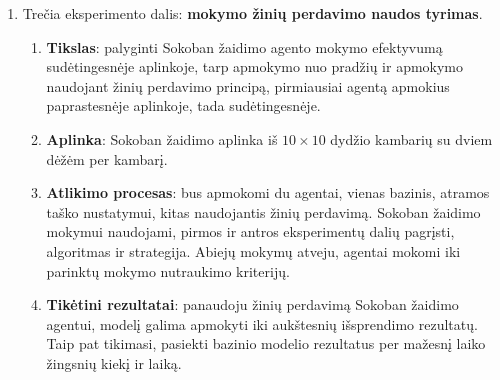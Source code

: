 \documentclass{VUMIFPSbakalaurinis}
\begin{document}
{\begin{enumerate}
\begin{enumerate}
			\item \textbf{Tikėtini rezultatai}: visų algoritmų panašus efektyvumas, tačiau ACER turėtų pasiekti patenkinamus rezultatus per mažesni žingsnių skaičių nei A2C, dėl patirties pakartojimo buferio. Taip pat, A2C laiko atžvilgiu turėtų baigti mokymosi procesą daug greičiau nei kiti algoritmai, dėl paprastesnės architektūros. Galiausiai, PPO2 yra paremtas A2C su pridėtais pagerinimais, tikimasi jog PPO2 mokysis greičiau nei A2C laiko žingsnių atžvilgiu.
		\end{enumerate}		
	
		\item Trečia eksperimento dalis: \textbf{mokymo žinių perdavimo naudos tyrimas}.
		\begin{enumerate}
			\item \textbf{Tikslas}: palyginti Sokoban žaidimo agento mokymo efektyvumą sudėtingesnėje aplinkoje, tarp apmokymo nuo pradžių ir apmokymo naudojant žinių perdavimo principą, pirmiausiai agentą apmokius paprastesnėje aplinkoje, tada sudėtingesnėje.
			
			\item \textbf{Aplinka}: Sokoban žaidimo aplinka iš \(10 \times 10\) dydžio kambarių su dviem dėžėm per kambarį.
			
			\item \textbf{Atlikimo procesas}: bus apmokomi du agentai, vienas bazinis, atramos taško nustatymui, kitas naudojantis žinių perdavimą. Sokoban žaidimo mokymui naudojami, pirmos ir antros eksperimentų dalių pagrįsti, algoritmas ir strategija. Abiejų mokymų atveju, agentai mokomi iki parinktų mokymo nutraukimo kriterijų.
			
			\item \textbf{Tikėtini rezultatai}: panaudoju žinių perdavimą Sokoban žaidimo agentui, modelį galima apmokyti iki aukštesnių išsprendimo rezultatų. Taip pat tikimasi, pasiekti bazinio modelio rezultatus per mažesnį laiko žingsnių kiekį ir laiką.
		\end{enumerate}		
	\end{enumerate}
}
\end{document}
